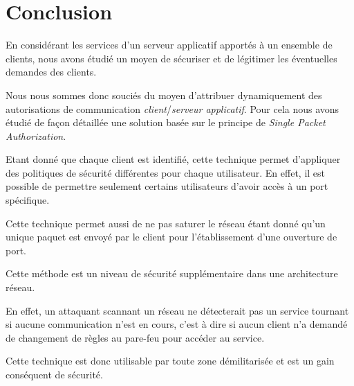 \chapter*{Conclusion}

En considérant les services d'un serveur applicatif apportés à un ensemble de clients, nous avons étudié un moyen de sécuriser et de légitimer les éventuelles demandes des clients.

Nous nous sommes donc souciés du moyen d'attribuer dynamiquement des autorisations de communication \emph{client}/\emph{serveur applicatif}. Pour cela nous avons étudié de façon détaillée une solution basée sur le principe de \emph{Single Packet Authorization}.

Etant donné que chaque client est identifié, cette technique permet d'appliquer des politiques de sécurité différentes pour chaque utilisateur. En effet, il est possible de permettre seulement certains utilisateurs d'avoir accès à un port spécifique.

Cette technique permet aussi de ne pas saturer le réseau étant donné qu'un unique paquet est envoyé par le client pour l'établissement d'une ouverture de port.

Cette méthode est un niveau de sécurité supplémentaire dans une architecture réseau. 

En effet, un attaquant scannant un réseau ne détecterait pas un service tournant si aucune communication n'est en cours, c'est à dire si aucun client n'a demandé de changement de règles au pare-feu pour accéder au service.

Cette technique est donc utilisable par toute zone démilitarisée et est un gain conséquent de sécurité.






